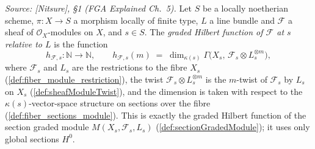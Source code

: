 \begin{definition}\leanok
  \label{def:fiber_hilbert_function}
  \textit{Source: [Nitsure], \S 1 (FGA Explained Ch.~5).}
  Let \(S\) be a locally noetherian scheme, \(\pi : X \to S\) a morphism
  locally of finite type, \(L\) a line bundle and \(\mathcal{F}\) a sheaf of
  \(\mathcal{O}_X\)-modules on \(X\), and \(s \in S\). The \emph{graded
  Hilbert function of \(\mathcal{F}\) at \(s\) relative to \(L\)} is the
  function
  \[
    h_{\mathcal{F},s} : \mathbb{N} \longrightarrow \mathbb{N}, \qquad
    h_{\mathcal{F},s}(m) \;=\;
    \dim_{\kappa(s)} \Gamma\bigl(X_s,\, \mathcal{F}_s \otimes L_s^{\otimes m}\bigr),
  \]
  where \(\mathcal{F}_s\) and \(L_s\) are the restrictions to the fibre
  \(X_s\) (\cref{def:fiber_module_restriction}), the twist
  \(\mathcal{F}_s \otimes L_s^{\otimes m}\) is the \(m\)-twist of
  \(\mathcal{F}_s\) by \(L_s\) on \(X_s\) (\cref{def:sheafModuleTwist}), and
  the dimension is taken with respect to the \(\kappa(s)\)-vector-space
  structure on sections over the fibre (\cref{def:fiber_sections_module}).
  This is exactly the graded Hilbert function of the section graded module
  \(M(X_s, \mathcal{F}_s, L_s)\) (\cref{def:sectionGradedModule}); it uses
  only global sections \(H^0\).
\end{definition}

